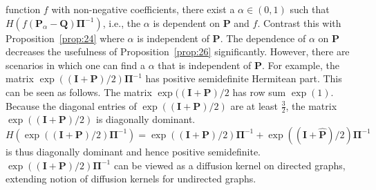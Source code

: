 	      function $f$ with non-negative coefficients, there exist a $\alpha \in (0,1)$ such that
	      $H(f(\mathbf{P}_{\alpha} - \mathbf{Q})\bm{\Pi}^{-1})$, i.e., the $\alpha$ is dependent on $\mathbf{P}$ and
	      $f$. Contrast this with Proposition~\ref{prop:24} where $\alpha$ is independent of $\mathbf{P}$. The
	      dependence of $\alpha$ on $\mathbf{P}$ decreases the usefulness of Proposition~\ref{prop:26}
	      significantly. However, there are scenarios in which one can find a $\alpha$ that is independent of
	      $\mathbf{P}$. For example, the matrix $\exp((\mathbf{I} + \mathbf{P})/2)\bm{\Pi}^{-1}$ has positive
	      semidefinite Hermitean part. This can be seen as follows. The matrix $\exp((\mathbf{I} + \mathbf{P})/2$
	      has row sum $\exp(1)$. Because the diagonal entries of $\exp((\mathbf{I} + \mathbf{P})/2)$ are at least
	      $\tfrac{3}{2}$, the matrix $\exp((\mathbf{I} + \mathbf{P})/2)$ is diagonally dominant. $H(\exp((\mathbf{I}
	      + \mathbf{P})/2)\bm{\Pi}^{-1}) = \exp((\mathbf{I} + \mathbf{P})/2)\bm{\Pi}^{-1} + \exp((\mathbf{I} +
	      \hat{\mathbf{P}})/2)\bm{\Pi}^{-1}$ is thus diagonally dominant and hence positive semidefinite.
	      $\exp((\mathbf{I} + \mathbf{P})/2)\bm{\Pi}^{-1}$ can be viewed as a diffusion kernel on directed graphs,
	      extending \citet{kondor02:_diffus} notion of diffusion kernels for undirected graphs.
